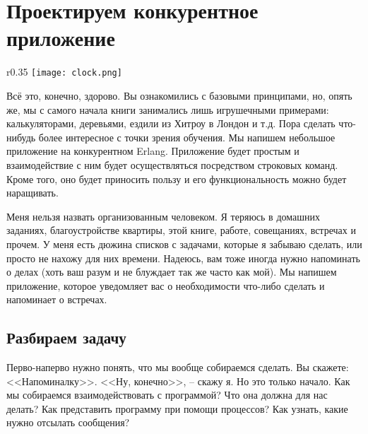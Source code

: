 \chapter{Проектируем конкурентное приложение}
\begin{wrapfigure}{r}{0.35\linewidth}
    \texttt{[image: clock.png]}
\end{wrapfigure}
Всё это, конечно, здорово.
Вы ознакомились с базовыми принципами, но, опять же, мы с самого начала книги занимались лишь игрушечными примерами: калькуляторами, деревьями, ездили из Хитроу в Лондон и т.д.
Пора сделать что\--нибудь более интересное с точки зрения обучения.
Мы напишем небольшое приложение на конкурентном Erlang.
Приложение будет простым и взаимодействие с ним будет осуществляться посредством строковых команд.
Кроме того, оно будет приносить пользу и его функциональность можно будет наращивать.

Меня нельзя назвать организованным человеком.
Я теряюсь в домашних заданиях, благоустройстве квартиры, этой книге, работе, совещаниях, встречах и прочем.
У меня есть дюжина списков с задачами, которые я забываю сделать, или просто не нахожу для них времени.
Надеюсь, вам тоже иногда нужно напоминать о делах (хоть ваш разум  и не блуждает так же часто как мой).
Мы напишем приложение, которое уведомляет вас о необходимости что\--либо сделать и напоминает о встречах.
\section{Разбираем задачу}
\label{understanding-the-problem}
Перво\--наперво нужно понять, что мы вообще собираемся сделать.
Вы скажете: <<Напоминалку>>.
<<Ну, конечно>>, \--- скажу я.
Но это только начало.
Как мы собираемся взаимодействовать с программой?
Что она должна для нас делать?
Как представить программу при помощи процессов?
Как узнать, какие нужно отсылать сообщения?

